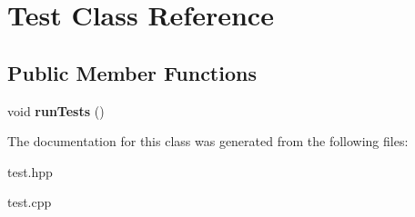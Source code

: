 \hypertarget{class_test}{\section{Test Class Reference}
\label{class_test}
}
\subsection*{Public Member Functions}
\begin{DoxyCompactItemize}
\item 
\hypertarget{class_test_a50697b06fcd7021c126a5bceceb6757c}{void {\bfseries run\-Tests} ()}\label{class_test_a50697b06fcd7021c126a5bceceb6757c}

\end{DoxyCompactItemize}


The documentation for this class was generated from the following files\-:\begin{DoxyCompactItemize}
\item 
test.\-hpp\item 
test.\-cpp\end{DoxyCompactItemize}
